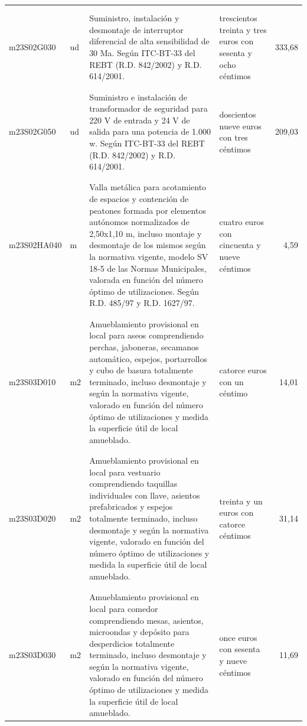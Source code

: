 \begin{supertabular}{|l|l|p{5cm}|p{3cm}|r|}
&&&&\\%
&&&&\\%
m23S02G030&ud&Suministro, instalación y desmontaje de interruptor diferencial de alta sensibilidad de 30 Ma. Según ITC{-}BT{-}33 del REBT (R.D. 842/2002) y R.D. 614/2001.&trescientos treinta y tres euros con sesenta y ocho céntimos&333,68\\%
&&&&\\%
&&&&\\%
m23S02G050&ud&Suministro e instalación de transformador de seguridad para 220 V de entrada y 24 V de salida para una potencia de 1.000 w. Según ITC{-}BT{-}33 del REBT (R.D. 842/2002) y R.D. 614/2001.&doscientos nueve euros con tres céntimos&209,03\\%
&&&&\\%
&&&&\\%
m23S02HA040&m&Valla metálica para acotamiento de espacios y contención de peatones formada por elementos autónomos normalizados de 2,50x1,10 m, incluso montaje y desmontaje de los mismos según la normativa vigente, modelo SV 18{-}5 de las Normas Municipales, valorada en función del número óptimo de utilizaciones. Según R.D. 485/97 y R.D. 1627/97.&cuatro euros con cincuenta y nueve céntimos&4,59\\%
&&&&\\%
&&&&\\%
m23S03D010&m2&Amueblamiento provisional en local para aseos comprendiendo perchas, jaboneras, secamanos automático, espejos, portarrollos y cubo de basura totalmente terminado, incluso desmontaje y según la normativa vigente, valorado en función del número óptimo de utilizaciones y medida la superficie útil de local amueblado.&catorce euros con un céntimo&14,01\\%
&&&&\\%
&&&&\\%
m23S03D020&m2&Amueblamiento provisional en local para vestuario comprendiendo taquillas individuales con llave, asientos prefabricados y espejos totalmente terminado, incluso desmontaje y según la normativa vigente, valorado en función del número óptimo de utilizaciones y medida la superficie útil de local amueblado.&treinta y un euros con catorce céntimos&31,14\\%
&&&&\\%
&&&&\\%
m23S03D030&m2&Amueblamiento provisional en local para comedor comprendiendo mesas, asientos, microondas y depósito para desperdicios totalmente terminado, incluso desmontaje y según la normativa vigente, valorado en función del número óptimo de utilizaciones y medida la superficie útil de local amueblado.&once euros con sesenta y nueve céntimos&11,69\\%

\end{supertabular}
